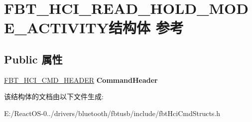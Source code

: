 \hypertarget{struct_f_b_t___h_c_i___r_e_a_d___h_o_l_d___m_o_d_e___a_c_t_i_v_i_t_y}{}\section{F\+B\+T\+\_\+\+H\+C\+I\+\_\+\+R\+E\+A\+D\+\_\+\+H\+O\+L\+D\+\_\+\+M\+O\+D\+E\+\_\+\+A\+C\+T\+I\+V\+I\+T\+Y结构体 参考}
\label{struct_f_b_t___h_c_i___r_e_a_d___h_o_l_d___m_o_d_e___a_c_t_i_v_i_t_y}
\subsection*{Public 属性}
\begin{DoxyCompactItemize}
\item 
\mbox{\label{struct_f_b_t___h_c_i___r_e_a_d___h_o_l_d___m_o_d_e___a_c_t_i_v_i_t_y_a2f0ef40fdaf8e6cf6753f8da24acb3ce}} 
\hyperlink{struct_f_b_t___h_c_i___c_m_d___h_e_a_d_e_r}{F\+B\+T\+\_\+\+H\+C\+I\+\_\+\+C\+M\+D\+\_\+\+H\+E\+A\+D\+ER} {\bfseries Command\+Header}
\end{DoxyCompactItemize}


该结构体的文档由以下文件生成\+:\begin{DoxyCompactItemize}
\item 
E\+:/\+React\+O\+S-\/0../drivers/bluetooth/fbtusb/include/fbt\+Hci\+Cmd\+Structs.\+h\end{DoxyCompactItemize}

